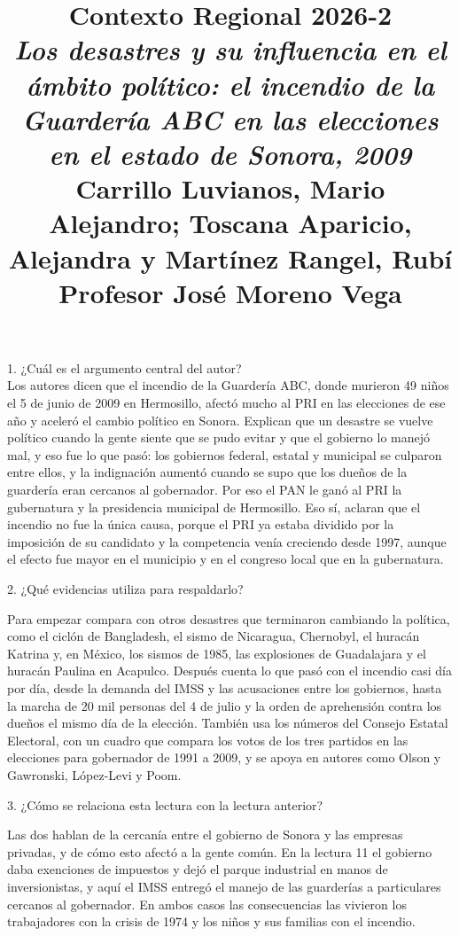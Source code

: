 \documentclass[a4paper, 11pt]{article}
\title
{
    \textbf{Contexto Regional 2026-2} \\[0.3cm]
    {\large \textit{Los desastres y su influencia en el ámbito político: el incendio de la Guardería ABC en las elecciones en el estado de Sonora, 2009}} \\[0.2cm]
    {\normalsize Carrillo Luvianos, Mario Alejandro; Toscana Aparicio, Alejandra y Martínez Rangel, Rubí} \\[0.3cm]
    {\normalsize Profesor José Moreno Vega}
}
\date{}
\begin{document}
\begin{otherlanguage}{spanish}
\maketitle
\end{otherlanguage}
\thispagestyle{fancy}
\vspace{-0.5cm}


{\Large 1. ¿Cuál es el argumento central del autor?} \\
{\color{azul}
    Los autores dicen que el incendio de la Guardería ABC, donde murieron 49 niños el 5 de junio de 2009 en Hermosillo, afectó mucho al PRI en las elecciones de ese año y aceleró el cambio político en Sonora. Explican que un desastre se vuelve político cuando la gente siente que se pudo evitar y que el gobierno lo manejó mal, y eso fue lo que pasó: los gobiernos federal, estatal y municipal se culparon entre ellos, y la indignación aumentó cuando se supo que los dueños de la guardería eran cercanos al gobernador. Por eso el PAN le ganó al PRI la gubernatura y la presidencia municipal de Hermosillo. Eso sí, aclaran que el incendio no fue la única causa, porque el PRI ya estaba dividido por la imposición de su candidato y la competencia venía creciendo desde 1997, aunque el efecto fue mayor en el municipio y en el congreso local que en la gubernatura.
}
\vspace{1cm}

{\Large 2. ¿Qué evidencias utiliza para respaldarlo?} \par
{\color{azul}
Para empezar compara con otros desastres que terminaron cambiando la política, como el ciclón de Bangladesh, el sismo de Nicaragua, Chernobyl, el huracán Katrina y, en México, los sismos de 1985, las explosiones de Guadalajara y el huracán Paulina en Acapulco. Después cuenta lo que pasó con el incendio casi día por día, desde la demanda del IMSS y las acusaciones entre los gobiernos, hasta la marcha de 20 mil personas del 4 de julio y la orden de aprehensión contra los dueños el mismo día de la elección. También usa los números del Consejo Estatal Electoral, con un cuadro que compara los votos de los tres partidos en las elecciones para gobernador de 1991 a 2009, y se apoya en autores como Olson y Gawronski, López-Levi y Poom.
}
\vspace{1cm}

{\Large 3. ¿Cómo se relaciona esta lectura con la lectura anterior?} \par
{\color{azul}
Las dos hablan de la cercanía entre el gobierno de Sonora y las empresas privadas, y de cómo esto afectó a la gente común. En la lectura 11 el gobierno daba exenciones de impuestos y dejó el parque industrial en manos de inversionistas, y aquí el IMSS entregó el manejo de las guarderías a particulares cercanos al gobernador. En ambos casos las consecuencias las vivieron los trabajadores con la crisis de 1974 y los niños y sus familias con el incendio.
}
\end{document}
